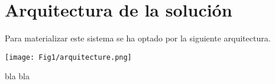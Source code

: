\chapter{Arquitectura de la solución}
	Para materializar este sistema se ha optado por la siguiente arquitectura.

	\noindent\texttt{[image: Fig1/arquitecture.png]}

	bla bla
